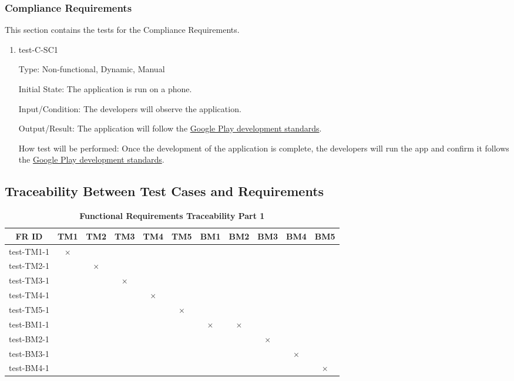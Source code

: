 \documentclass[12pt, titlepage]{article}
\begin{document}
\subsubsection{Compliance Requirements}

This section contains the tests for the Compliance Requirements.
		
\begin{enumerate}

\item{test-C-SC1\\}

Type: Non-functional, Dynamic, Manual 
					
Initial State: The application is run on a phone.
					
Input/Condition: The developers will observe the application.
					
Output/Result: The application will follow the \href{https://play.google.com/about/developer-content-policy/}{Google Play development standards}.
					
How test will be performed: Once the development of the application is complete, the developers will run the app and confirm it follows the \href{https://play.google.com/about/developer-content-policy/}{Google Play development standards}.

\end{enumerate}

\subsection{Traceability Between Test Cases and Requirements}


\begin{table}[H]
\centering
\begin{tabular}{|c | c c c c c c c c c c|}
\hline
FR ID & TM1 & TM2 & TM3 & TM4 & TM5 & BM1 & BM2 & BM3 & BM4 & BM5 \\
\hline 
test-TM1-1 & $\times$ & & & & & & & & & \\ \hline
test-TM2-1 & & $\times$ & & & & & & & & \\ \hline
test-TM3-1 & & & $\times$ & & & & & & & \\ \hline
test-TM4-1 & & & & $\times$ & & & & & & \\ \hline
test-TM5-1 & & & & & $\times$ & & & & & \\ \hline
test-BM1-1 & & & & & & $\times$ & $\times$ & & & \\ \hline
test-BM2-1 & & & & & & & & $\times$ & & \\ \hline
test-BM3-1 & & & & & & & & & $\times$ & \\ \hline
test-BM4-1 & & & & & & & & & & $\times$ \\ \hline

\hline
\end{tabular}
\caption{\bf Functional Requirements Traceability Part 1}
\end{table}
\end{document}
